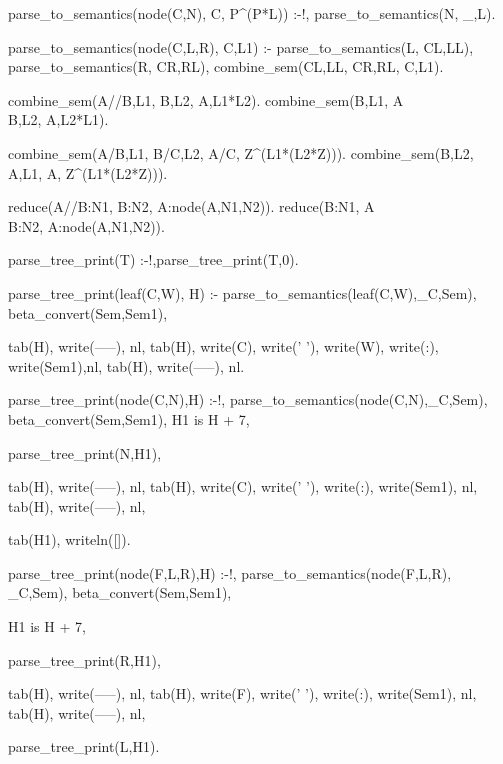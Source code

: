 \documentclass{book}[9pt]
\newenvironment{code}%
{\small \verbatim}%
{\endverbatim \large}
\begin{document}
\begin{code}
parse_to_semantics(node(C,N), C, P^(P*L)) :-!,
        parse_to_semantics(N, _,L).
        

parse_to_semantics(node(C,L,R), C,L1) :-
        parse_to_semantics(L, CL,LL),
        parse_to_semantics(R, CR,RL),
        combine_sem(CL,LL, CR,RL, C,L1).

combine_sem(A//B,L1,   B,L2,  A,L1*L2).
combine_sem(B,L1,  A\\B,L2,  A,L2*L1).
        

combine_sem(A/B,L1,  B/C,L2,  A/C, Z^(L1*(L2*Z))).
combine_sem(B\C,L2,  A\B,L1,  A\C, Z^(L1*(L2*Z))).

reduce(A//B:N1,    B:N2,    A:node(A,N1,N2)).
reduce(B:N1,    A\\B:N2,    A:node(A,N1,N2)).



parse_tree_print(T) :-!,parse_tree_print(T,0).

parse_tree_print(leaf(C,W), H) :-
        parse_to_semantics(leaf(C,W),_C,Sem), beta_convert(Sem,Sem1),
        
        tab(H), write(-----),    nl,
        tab(H), write(C), write(' '), write(W), write(:), write(Sem1),nl,
        tab(H), write(-----),    nl.
        

parse_tree_print(node(C,N),H) :-!,
        parse_to_semantics(node(C,N),_C,Sem), beta_convert(Sem,Sem1),
        H1 is H + 7,
        
        parse_tree_print(N,H1),
        
        tab(H), write(-----),    nl,
        tab(H), write(C), write(' '), write(:), write(Sem1), nl,
        tab(H), write(-----),  nl,
        
        tab(H1), writeln([]).

parse_tree_print(node(F,L,R),H) :-!,
        parse_to_semantics(node(F,L,R), _C,Sem), beta_convert(Sem,Sem1),
        
        H1 is H + 7,
        
        parse_tree_print(R,H1),
        
        tab(H), write(-----),    nl,
        tab(H), write(F), write(' '), write(:), write(Sem1), nl,
        tab(H), write(-----),    nl,
        
        parse_tree_print(L,H1).
\end{code}
\end{document}
